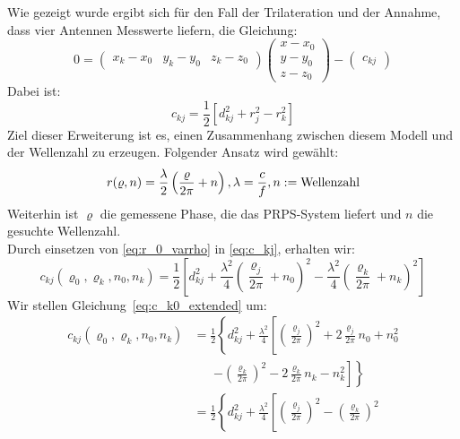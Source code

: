 {
%
Wie gezeigt wurde ergibt sich für den Fall der Trilateration und der Annahme, dass vier Antennen Messwerte liefern, die Gleichung:
\begin{equation}\label{eq:final_trilateration_model}
0=
\left(
	\begin{array}{ccc}
		x_k-x_0 & y_k-y_0 & z_k-z_0 
	\end{array}
\right)
\left(
   \begin{array}{c}
	   x-x_0\\
	   y-y_0\\
	   z-z_0
   \end{array}
\right)
-
\left(
	\begin{array}{c}
		c_{kj}
	\end{array}
\right) 
\end{equation}
%
Dabei ist:
\begin{equation}\label{eq:c_kj}
	c_{kj}=\frac{1}{2}[d_{kj}^2+r_{j}^2-r_k^2]
\end{equation}
%
Ziel dieser Erweiterung ist es, einen Zusammenhang zwischen diesem Modell und der Wellenzahl zu erzeugen. Folgender Ansatz wird gewählt:
	\begin{equation}\label{eq:r_0_varrho} r(\varrho,n)=\frac{\lambda}{2}\left(\frac{\varrho}{2\pi}+n\right),\\\lambda=\frac{c}{f}, n:= \text{Wellenzahl}
\end{equation}
%
%
Weiterhin ist $\varrho$ die gemessene Phase, die das PRPS-System liefert und $n$ die gesuchte Wellenzahl.\\
Durch einsetzen von \eqref{eq:r_0_varrho} in \eqref{eq:c_kj}, erhalten wir:
\begin{equation}\label{eq:c_k0_extended}
	c_{kj}(\varrho_0, \varrho_k, n_0, n_k) =\frac{1}{2}\left[d_{kj}^2+\frac{\lambda^2}{4}\left(\frac{\varrho_j}{2\pi}+n_0\right)^2-\frac{\lambda^2}{4}\left(\frac{\varrho_k}{2\pi}+n_k\right)^2\right]
\end{equation}
%
Wir stellen Gleichung~\eqref{eq:c_k0_extended} um:
\begin{align}
%	
	c_{kj}(\varrho_0, \varrho_k, n_0, n_k) &= \frac{1}{2}\left\{d_{kj}^2+\frac{\lambda^2}{4}\left[\left(\frac{\varrho_j}{2\pi}\right)^2+2\frac{\varrho_j}{2\pi}n_0+n_0^2 \right.\right.\nonumber\\
	&\phantom{=}\; 
	\left.\left.-\left(\frac{\varrho_k}{2\pi}\right)^2-2\frac{\varrho_k}{2\pi}n_k-n_k^2\right]\right\}\\
%    
    &=\frac{1}{2}\left\{d_{kj}^2+\frac{\lambda^2}{4}\left[\left(\frac{\varrho_j}{2\pi}\right)^2-\left(\frac{\varrho_k}{2\pi}\right)^2 \right.\right.\nonumber\\

\end{align}}
